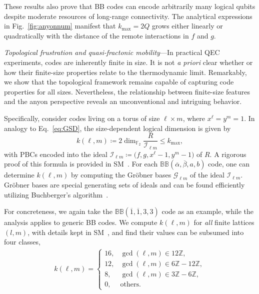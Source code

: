 \documentclass[aps,prl,english,superscriptaddress,twocolumn,tightenlines,showpacs,longbibliography,floatfix,amsfonts]{revtex4-2}
\begin{document}
	These results also prove that BB codes can encode arbitrarily many logical qubits despite moderate resources of long-range connectivity.
	The analytical expressions in Fig.~\ref{fig:anyonnum} manifest that $k_{\max}=2Q$ grows either linearly or quadratically with the distance of the remote interactions in $f$ and $g$.
	
	
	
	\emph{Topological frustration and quasi-fractonic mobility}---In practical QEC experiments, codes are inherently finite in size.
	It is not \textit{a priori} clear whether or how their finite-size properties relate to the thermodynamic limit.
	Remarkably, we show that the topological framework remains capable of capturing code properties for all sizes.
	Nevertheless, the relationship between finite-size features and the anyon perspective reveals an unconventional and intriguing behavior.
	
	
	
	Specifically, consider codes living on a torus of size $\ell \times m$, where $x^\ell=y^m=1$.
	In analogy to Eq.~\eqref{eq:GSD}, the size-dependent logical dimension is given by
	\begin{equation}\label{eq:GSDtorus}
		k(\ell, m)\coloneqq 2\dim_{\mathbb{F}_{2}}\frac{R}{\mathcal{I}_{\ell m}} \leq k_{\max},
	\end{equation}
	with PBCs encoded into the ideal $\mathcal{I}_{\ell m} \coloneqq \big(f,g,x^\ell-1,y^m-1\big)$ of $R$.
	A rigorous proof of this formula is provided in SM~\cite{SM1}. For each $\mathbb{BB}(\overline{\alpha}, \overline{\beta}, a, b)$ code, one can determine $k(\ell, m)$ by computing the Gr\"obner bases $\mathcal{G}_{\ell m}$ of the ideal $\mathcal{I}_{\ell m}$.
	Gr\"obner bases are special generating sets of ideals and can be found efficiently utilizing Buchberger's algorithm~\cite{SM1}. 
	
	
	For concreteness, we again take the $\mathbb{BB}(\overline{1},\overline{1},3,3)$ code as an example, while the analysis applies to generic BB codes.
	We compute $k(\ell, m)$ for \emph{all} finite lattices $(l, m)$, with details kept in SM~\cite{SM1}, and find their values can be subsumed into four classes,
	\begin{align}\label{eq:k_33}
		k(\ell, m) = \begin{cases}
			16, & \gcd(\ell,m) \in 12\mathbb{Z}, \\
			12, & \gcd(\ell,m) \in 6\mathbb{Z} -12\mathbb{Z}, \\
			8, & \gcd(\ell,m) \in 3\mathbb{Z} - 6\mathbb{Z},\\
			0, & \text{others}. 
		\end{cases}
	\end{align}
	
\end{document}

